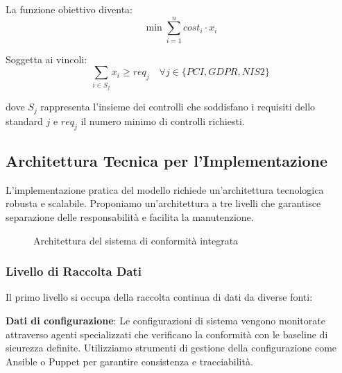 La funzione obiettivo diventa:
\begin{equation}
\min \sum_{i=1}^{n} cost_i \cdot x_i
\end{equation}

Soggetta ai vincoli:
\begin{equation}
\sum_{i \in S_j} x_i \geq req_j \quad \forall j \in \{PCI, GDPR, NIS2\}
\end{equation}

dove $S_j$ rappresenta l'insieme dei controlli che soddisfano i requisiti dello standard $j$ e $req_j$ il numero minimo di controlli richiesti.

\subsection{Architettura Tecnica per l'Implementazione}
\label{subsec:4.3.2_architettura}

L'implementazione pratica del modello richiede un'architettura tecnologica robusta e scalabile. Proponiamo un'architettura a tre livelli che garantisce separazione delle responsabilità e facilita la manutenzione.

\begin{figure}[h]
\centering
{}
\caption{Architettura del sistema di conformità integrata}
\label{fig:architettura_sistema}
\end{figure}

\subsubsection{Livello di Raccolta Dati}

Il primo livello si occupa della raccolta continua di dati da diverse fonti:

\textbf{Dati di configurazione}: Le configurazioni di sistema vengono monitorate attraverso agenti specializzati che verificano la conformità con le baseline di sicurezza definite. Utilizziamo strumenti di gestione della configurazione come Ansible o Puppet per garantire consistenza e tracciabilità.


